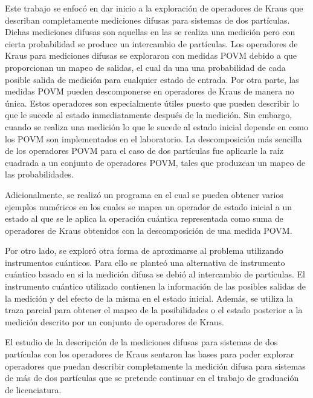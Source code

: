 Este trabajo se enfocó en dar inicio a la exploración de operadores de Kraus
que describan completamente mediciones difusas para sistemas de dos partículas.
Dichas mediciones difusas son aquellas en las se realiza una medición pero con
cierta probabilidad se produce un intercambio de partículas.  
Los operadores de Kraus para mediciones difusas se exploraron con medidas POVM
debido a que proporcionan un mapeo de salidas, el cual da una una probabilidad
de cada posible salida de medición para cualquier estado de entrada. Por otra
parte, las medidas POVM pueden descomponerse en operadores de Kraus de manera
no única. Estos operadores son especialmente útiles puesto que pueden describir
lo que le sucede al estado inmediatamente después de la medición. Sin embargo,
cuando se realiza una medición lo que le sucede al estado inicial depende en
como los POVM son implementados en el laboratorio. La descomposición más
sencilla de los operadores POVM para el caso de dos partículas fue aplicarle la
raíz cuadrada a un conjunto de operadores POVM, tales que produzcan un mapeo de
las probabilidades. 

Adicionalmente, se realizó un programa en el cual se pueden obtener varios ejemplos numéricos en los cuales se mapea un operador de estado inicial a un estado al que se le aplica la operación cuántica representada como suma de operadores de Kraus obtenidos con la descomposición de una medida POVM\@.

Por otro lado, se exploró otra forma de aproximarse al problema utilizando instrumentos cuánticos. Para ello se planteó una alternativa de instrumento cuántico basado en si la medición difusa se debió al intercambio de partículas. %
 El instrumento cuántico utilizado contienen la información de las posibles salidas de la medición  y del efecto de la misma en el estado inicial. Además, se utiliza la traza parcial para obtener el mapeo de la posibilidades o el estado posterior a la medición descrito por un conjunto de operadores de Kraus.

El estudio de la descripción de la mediciones difusas para sistemas de dos partículas con los operadores de Kraus sentaron las bases para poder explorar operadores que puedan describir completamente la medición difusa para sistemas de más de dos partículas que se pretende continuar en el trabajo de graduación de licenciatura.
